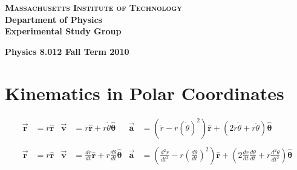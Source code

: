 \documentclass{article}
\let\oldvec=\vec
\let\oldhat=\hat
\renewcommand{\vec}[1]{\oldvec{\boldsymbol{#1}}}
\renewcommand{\hat}[1]{\oldhat{\boldsymbol{#1}}}
\newcommand{\uvec}[1]{\hat{#1}}
\begin{document}
{\large
\begin{center}
\textbf{\textsc{Massachusetts Institute of Technology}} \\
 \textbf{Department of Physics} \\
 \textbf{Experimental Study Group}
\end{center}
\noindent \textbf{Physics 8.012 \hfill Fall Term 2010}} \par

\section*{Kinematics in Polar Coordinates}
\begin{align*}
  \vec r & = r \uvec r &
  \vec v & = \dot r\uvec r + r\dot\theta \uvec\theta &
  \vec a & = \left(\ddot r - r(\dot \theta)^2\right)\uvec r + \left(2\dot r\dot \theta + r \ddot \theta\right)\uvec \theta \\
  \\
  \vec r & = r \uvec r &
  \vec v & = \frac{dr}{dt}\uvec r + r\frac{d\theta}{dt} \uvec\theta &
  \vec a & = \left(\frac{d^2r}{dt^2} - r\left(\frac{d\theta}{dt}\right)^2\right)\uvec r + \left(2\frac{dr}{dt}\frac{d\theta}{dt} + r \frac{d^2\theta}{dt^2}\right)\uvec \theta
\end{align*}
\end{document}
